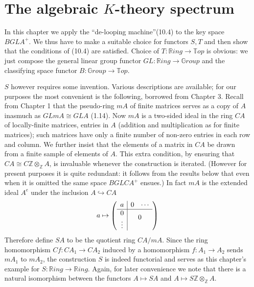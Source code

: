 \documentclass[openany,leqno]{book}  %
\newcommand{\Z}{\mathbb{Z}}
\begin{document}

\chapter{The algebraic $K$-theory spectrum} %
\label{cha:11the_algebraic_k_theory_spectrum}
In this chapter we apply the ``de-looping machine''(10.4) to the key space $BGLA^+$. We thus have to make a suitable choice for functors $S, T$ and then show that the conditions of (10.4) are satisfied. Choice of $T \colon   \mathbb{R}ing \longrightarrow \mathbb{T}op$ is obvious: we just compose the general linear group functor $GL \colon   \mathbb{R}ing \longrightarrow \mathbb{G}roup$ and the classifying space functor $B \colon   \mathbb{G}roup \longrightarrow \mathbb{T}op$.

$S$ however requires some invention. Various descriptions are available; for our purposes the most convenient is the following, borrowed from Chapter 3. Recall from Chapter 1 that the pseudo-ring $mA$ of finite matrices serves as a copy of $A$ inasmuch as $GLmA \cong GLA$ (1.14). Now $mA$ is a two-sided ideal in the ring $CA$ of locally-finite matrices, entries in $A$ (addition and multiplication as for finite matrices); such matrices have only a finite number of non-zero entries in each row and column. We further insist that the elements of a matrix in $CA$ be drawn from a finite sample of elements of $A$. This extra condition, by ensuring that $CA\cong C\Z \otimes_\Z A$, is invaluable whenever the construction is iterated. (However for present purposes it is quite redundant: it follows from the results below that even when it is omitted the same space $BGLCA^+$ ensues.) In fact $mA$ is the extended ideal $A^e$ under the inclusion $A \hookrightarrow CA$
\[a\mapsto \left(
\begin{array}{c|cc}
 a& 0& \cdots\\
 \hline
0 & \multicolumn{2}{c}{\multirow{2}{*}{$0$}} \\
\vdots&  &\\
\end{array}\right)\]
Therefore define $SA$ to be the quotient ring $CA/mA$. Since the ring homomorphism $Cf \colon   CA_1\longrightarrow CA_2$ induced by a homomorphism $f\colon   A_1 \longrightarrow A_2$ sends $mA_1$ to $mA_2$, the construction $S$ is indeed functorial and serves as this chapter's example for $S \colon   \mathbb{R}ing \longrightarrow \mathbb{R}ing$. Again, for later convenience we note that there is a natural isomorphism between the functors $A \mapsto SA$ and
$A\mapsto S\Z \otimes_\Z A$.
\end{document}

